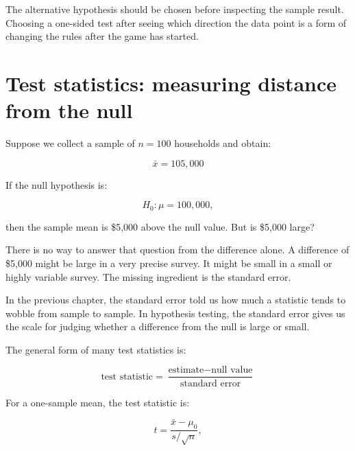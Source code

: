 \documentclass[
  letterpaper,
  DIV=11,
  numbers=noendperiod]{scrreprt}
\begin{document}
\begin{tcolorbox}[enhanced jigsaw, arc=.35mm, bottomrule=.15mm, bottomtitle=1mm, breakable, colback=white, colbacktitle=quarto-callout-important-color!10!white, colframe=quarto-callout-important-color-frame, coltitle=black, left=2mm, leftrule=.75mm, opacityback=0, opacitybacktitle=0.6, rightrule=.15mm, title=\textcolor{quarto-callout-important-color}{\faExclamation}\hspace{0.5em}{Warning: Choose the alternative before looking at the data}, titlerule=0mm, toprule=.15mm, toptitle=1mm]

The alternative hypothesis should be chosen before inspecting the sample
result. Choosing a one-sided test after seeing which direction the data
point is a form of changing the rules after the game has started.

\end{tcolorbox}

\section{Test statistics: measuring distance from the
null}\label{test-statistics-measuring-distance-from-the-null}

Suppose we collect a sample of \(n = 100\) households and obtain:

\[
\bar{x} = 105{,}000
\]

If the null hypothesis is:

\[
H_0: \mu = 100{,}000,
\]

then the sample mean is \$5,000 above the null value. But is \$5,000
large?

There is no way to answer that question from the difference alone. A
difference of \$5,000 might be large in a very precise survey. It might
be small in a small or highly variable survey. The missing ingredient is
the standard error.

In the previous chapter, the standard error told us how much a statistic
tends to wobble from sample to sample. In hypothesis testing, the
standard error gives us the scale for judging whether a difference from
the null is large or small.

The general form of many test statistics is:

\[
\text{test statistic}
=
\frac{\text{estimate} - \text{null value}}{\text{standard error}}
\]

For a one-sample mean, the test statistic is:

\[
t
=
\frac{\bar{x} - \mu_0}{s / \sqrt{n}},
\]
\end{document}

